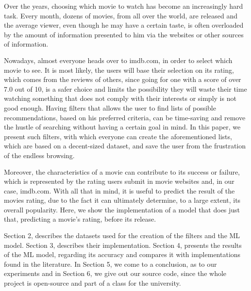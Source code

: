 \documentclass[letterpaper,twocolumn,10pt]{article}
\begin{document}
\par Over the years, choosing which movie to watch has become an increasingly hard task. Every month, dozens of movies, from all over the world, are released and the average viewer, even though he may have a certain taste, is often overloaded by the amount of information presented to him via the websites or other sources of information. 
\par Nowadays, almost everyone heads over to imdb.com, in order to select which movie to see. It is most likely, the users will base their selection on its rating, which comes from the reviews of others, since going for one with a score of over 7.0 out of 10, is a safer choice and limits the possibility they will waste their time watching something that does not comply with their interests or simply is not good enough. Having filters that allows the user to find lists of possible recommendations, based on his preferred criteria, can be time-saving and remove the hustle of searching without having a certain goal in mind. In this paper, we present such filters, with which everyone can create the aforementioned lists, which are based on a decent-sized dataset, and save the user from the frustration of the endless browsing.
\par Moreover, the characteristics of a movie can contribute to its success or failure, which is represented by the rating users submit in movie websites and, in our case, imdb.com. With all that in mind, it is useful to predict the result of the movies rating, due to the fact it can ultimately determine, to a large extent, its overall popularity. Here, we show the implementation of a model that does just that, predicting a movie's rating, before its release.
\par Section 2, describes the datasets used for the creation of the filters and the ML model. Section 3, describes their implementation. Section 4, presents the results of the ML model, regarding its accuracy and compares it with implementations found in the literature. In Section 5, we come to a conclusion, as to our experiments and in Section 6, we give out our source code, since the whole project is open-source and part of a class for the university.
\end{document}
